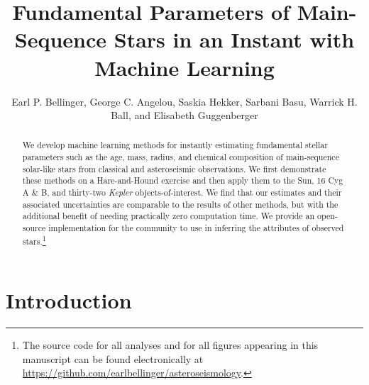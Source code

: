 \documentclass[manuscript]{aastex}
\begin{document}
\title{Fundamental Parameters of Main-Sequence Stars in an Instant with Machine Learning}

\author{Earl P. Bellinger, George C. Angelou, Saskia Hekker, Sarbani Basu, Warrick H. Ball, and Elisabeth Guggenberger}


\begin{abstract}
We develop machine learning methods for instantly estimating fundamental stellar parameters such as the age, mass, radius, and chemical composition of main-sequence solar-like stars from classical and asteroseismic observations. We first demonstrate these methods on a Hare-and-Hound exercise and then apply them to the Sun, 16 Cyg A \& B, and thirty-two \emph{Kepler} objects-of-interest. We find that our estimates and their associated uncertainties are comparable to the results of other methods, but with the additional benefit of needing practically zero computation time. We provide an open-source implementation for the community to use in inferring the attributes of observed stars.\footnote{The source code for all analyses and for all figures appearing in this manuscript can be found electronically at \url{https://github.com/earlbellinger/asteroseismology}.}
\end{abstract}




\section{Introduction}
\end{document}
